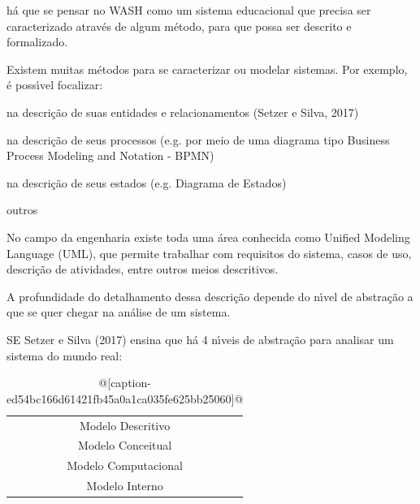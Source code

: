 \documentclass[
12pt,		%
openright,	%
twoside,  %
a4paper,			%
chapter=TITLE,		%
english,			%
french,				%
spanish,			%
brazil				%
]{USPSC-classe/USPSC_RedarTex}
\begin{document}
h\'a que se pensar no WASH como um sistema educacional que precisa ser caracterizado atrav\'es de algum m\'etodo, para que possa ser descrito e formalizado.








Existem muitas m\'etodos para se caracterizar ou modelar sistemas. Por exemplo, \'e poss\'{\i}vel focalizar:









\begin{alineas}
\item na descri\c{c}\~ao de suas entidades e relacionamentos  (Setzer e Silva, 2017)
\item na descri\c{c}\~ao de seus processos (e.g. por meio de uma diagrama tipo Business Process Modeling and Notation - BPMN)
\item na descri\c{c}\~ao de seus estados (e.g. Diagrama de Estados)
\item outros
\end{alineas}

No campo da engenharia existe toda uma \'area conhecida como Unified Modeling Language (UML), que permite trabalhar com requisitos do sistema, casos de uso, descri\c{c}\~ao de atividades, entre outros meios descritivos.








A profundidade do detalhamento dessa descri\c{c}\~ao depende do n\'{\i}vel de abstra\c{c}\~ao a que se quer chegar na an\'alise de um sistema.








SE Setzer e Silva (2017) ensina que h\'a 4 n\'{\i}veis de abstra\c{c}\~ao para analisar um sistema do mundo real:












\begin{table}[Htb]
\tiny
\caption{\label{ed54bc166d61421fb45a0a1ca035fe625bb25060}@[caption-ed54bc166d61421fb45a0a1ca035fe625bb25060]@}

\centering
\begin{tabular}{|c|}
\hline
Modelo Descritivo \\
Modelo Conceitual \\
Modelo Computacional \\
Modelo Interno \\
\hline
\end{tabular}
\end{table}
\end{document}
